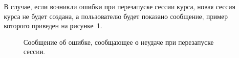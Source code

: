В случае, если возникли ошибки при перезапуске сессии курса, новая сессия курса не будет создана, а пользователю будет показано сообщение, пример которого приведен на рисунке~\ref{img:course_session:session_rerun_error}.

\begin{figure}[H]
	\caption{Сообщение об ошибке, сообщающее о неудаче при перезапуске сессии.}
	\label{img:course_session:session_rerun_error}
\end{figure}